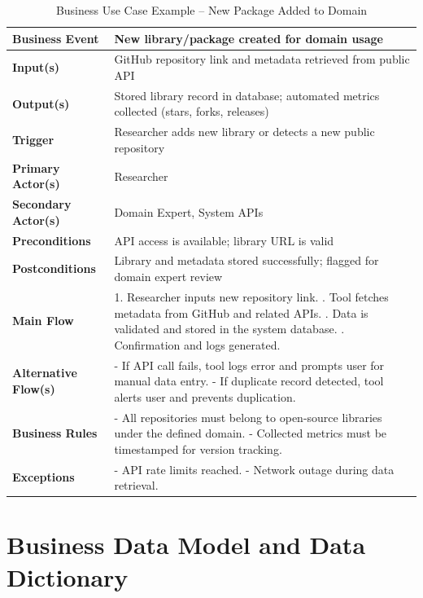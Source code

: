 \documentclass[12pt]{article}
\begin{document}
\begin{table}[H]
\caption{Business Use Case Example – New Package Added to Domain}
\centering
\begin{tabularx}{\textwidth}{|p{3cm}|X|}
\hline
\textbf{Business Event} & New library/package created for domain usage \\ \hline
\textbf{Input(s)} & GitHub repository link and metadata retrieved from public API \\ \hline
\textbf{Output(s)} & Stored library record in database; automated metrics collected (stars, forks, releases) \\ \hline
\textbf{Trigger} & Researcher adds new library or detects a new public repository \\ \hline
\textbf{Primary Actor(s)} & Researcher \\ \hline
\textbf{Secondary Actor(s)} & Domain Expert, System APIs \\ \hline
\textbf{Preconditions} & API access is available; library URL is valid \\ \hline
\textbf{Postconditions} & Library and metadata stored successfully; flagged for domain expert review \\ \hline
\textbf{Main Flow} &  
1. Researcher inputs new repository link. \newline
2. Tool fetches metadata from GitHub and related APIs. \newline
3. Data is validated and stored in the system database. \newline
4. Confirmation and logs generated. \\ \hline
\textbf{Alternative Flow(s)} &  
- If API call fails, tool logs error and prompts user for manual data entry. \newline
- If duplicate record detected, tool alerts user and prevents duplication. \\ \hline
\textbf{Business Rules} &  
- All repositories must belong to open-source libraries under the defined domain. \newline
- Collected metrics must be timestamped for version tracking. \\ \hline
\textbf{Exceptions} &  
- API rate limits reached. \newline
- Network outage during data retrieval. \\ \hline
\end{tabularx}
\end{table}

\section{Business Data Model and Data Dictionary}
\end{document}
